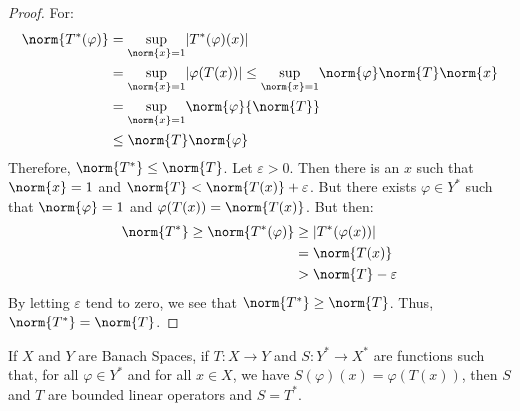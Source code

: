         \begin{proof}
            For:
            \begin{subequations}
                \begin{align}
                    \norm{T^{*}(\varphi)}&=
                    \underset{\norm{x}=1}{\sup}|T^{*}(\varphi)(x)|\\
                    &=\underset{\norm{x}=1}{\sup}|\varphi(T(x))|\leq
                    \underset{\norm{x}=1}{\sup}
                        \norm{\varphi}\norm{T}\norm{x}\\
                    &=\underset{\norm{x}=1}{\sup}
                        \norm{\varphi}{\norm{T}}\\
                    &\leq\norm{T}\norm{\varphi}
                \end{align}
            \end{subequations}
            Therefore, $\norm{T^{*}}\leq\norm{T}$. Let
            $\varepsilon>0$. Then there is an $x$ such that
            $\norm{x}=1$ and $\norm{T}<\norm{T(x)}+\varepsilon$.
            But there exists $\varphi\in{Y}^{*}$ such that
            $\norm{\varphi}=1$ and $\varphi(T(x))=\norm{T(x)}$.
            But then:
            \begin{subequations}
                \begin{align}
                    \norm{T^{*}}\geq\norm{T^{*}(\varphi)}
                    &\geq|T^{*}(\varphi(x))|\\
                    &=\norm{T(x)}\\
                    &>\norm{T}-\varepsilon
                \end{align}
            \end{subequations}
            By letting $\varepsilon$ tend to zero, we see that
            $\norm{T^{*}}\geq\norm{T}$. Thus,
            $\norm{T^{*}}=\norm{T}$.
        \end{proof}
        \begin{theorem}
            If $X$ and $Y$ are Banach Spaces, if $T:X\rightarrow{Y}$
            and $S:Y^{*}\rightarrow{X}^{*}$ are functions such
            that, for all $\varphi\in{Y}^{*}$ and for all $x\in{X}$,
            we have $S(\varphi)(x)=\varphi(T(x))$, then $S$ and $T$
            are bounded linear operators and $S=T^{*}$.
        \end{theorem}
